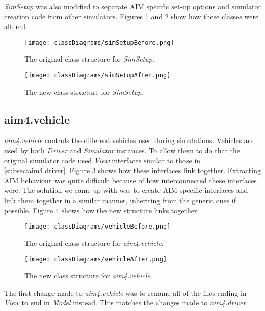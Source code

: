 \begin{appendices}
\emph{SimSetup} was also modified to separate AIM specific set-up options and simulator creation code from other simulators. Figures \ref{fig:simSetupBefore} and \ref{fig:simSetupAfter} show how these classes were altered.

\begin{figure}[htb]
\texttt{[image: classDiagrams/simSetupBefore.png]}
\caption{The original class structure for \emph{SimSetup}.}
\label{fig:simSetupBefore}
\end{figure}

\begin{figure}[htb]
\texttt{[image: classDiagrams/simSetupAfter.png]}
\caption{The new class structure for \emph{SimSetup}.}
\label{fig:simSetupAfter}
\end{figure}

\subsection{aim4.vehicle}
\label{subsec:aim4.vehicle}
\emph{aim4.vehicle} controls the different vehicles used during simulations. Vehicles are used by both \emph{Driver} and \emph{Simulator} instances. To allow them to do that the original simulator code used \emph{View} interfaces similar to those in \ref{subsec:aim4.driver}. Figure \ref{fig:vehicleBefore} shows how these interfaces link together. Extracting AIM behaviour was quite difficult because of how interconnected these interfaces were. The solution we came up with was to create AIM specific interfaces and link them together in a similar manner, inheriting from the generic ones if possible. Figure \ref{fig:vehicleAfter} shows how the new structure links together.

\begin{figure}[htb]
\texttt{[image: classDiagrams/vehicleBefore.png]}
\caption{The original class structure for \emph{aim4.vehicle}.}
\label{fig:vehicleBefore}
\end{figure}

\begin{figure}[htb]
\texttt{[image: classDiagrams/vehicleAfter.png]}
\caption{The new class structure for \emph{aim4.vehicle}.}
\label{fig:vehicleAfter}
\end{figure}

The first change made to \emph{aim4.vehicle} was to rename all of the files ending in \emph{View} to end in \emph{Model} instead. This matches the changes made to \emph{aim4.driver}.


\end{appendices}

